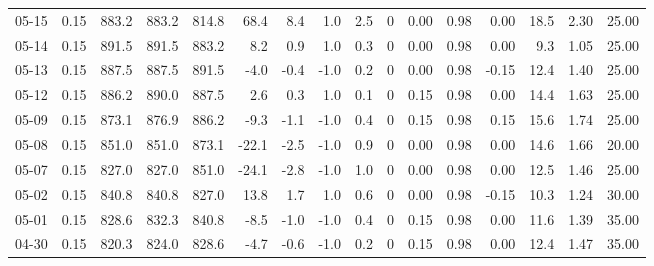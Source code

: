 \begin{threeparttable}
{\begin{tabular}{lrrrrrrrrrrrrrrr}
  05-15 &     0.15 & 883.2 & 883.2 & 814.8 &       68.4 &            8.4 &                      1.0 &                 2.5 &              0 &       0.00 &      0.98 &           0.00 &             18.5 &            2.30 &                  25.00 \\
  05-14 &     0.15 & 891.5 & 891.5 & 883.2 &        8.2 &            0.9 &                      1.0 &                 0.3 &              0 &       0.00 &      0.98 &           0.00 &              9.3 &            1.05 &                  25.00 \\
  05-13 &     0.15 & 887.5 & 887.5 & 891.5 &       -4.0 &           -0.4 &                     -1.0 &                 0.2 &              0 &       0.00 &      0.98 &          -0.15 &             12.4 &            1.40 &                  25.00 \\
  05-12 &     0.15 & 886.2 & 890.0 & 887.5 &        2.6 &            0.3 &                      1.0 &                 0.1 &              0 &       0.15 &      0.98 &           0.00 &             14.4 &            1.63 &                  25.00 \\
  05-09 &     0.15 & 873.1 & 876.9 & 886.2 &       -9.3 &           -1.1 &                     -1.0 &                 0.4 &              0 &       0.15 &      0.98 &           0.15 &             15.6 &            1.74 &                  25.00 \\
  05-08 &     0.15 & 851.0 & 851.0 & 873.1 &      -22.1 &           -2.5 &                     -1.0 &                 0.9 &              0 &       0.00 &      0.98 &           0.00 &             14.6 &            1.66 &                  20.00 \\
  05-07 &     0.15 & 827.0 & 827.0 & 851.0 &      -24.1 &           -2.8 &                     -1.0 &                 1.0 &              0 &       0.00 &      0.98 &           0.00 &             12.5 &            1.46 &                  25.00 \\
  05-02 &     0.15 & 840.8 & 840.8 & 827.0 &       13.8 &            1.7 &                      1.0 &                 0.6 &              0 &       0.00 &      0.98 &          -0.15 &             10.3 &            1.24 &                  30.00 \\
  05-01 &     0.15 & 828.6 & 832.3 & 840.8 &       -8.5 &           -1.0 &                     -1.0 &                 0.4 &              0 &       0.15 &      0.98 &           0.00 &             11.6 &            1.39 &                  35.00 \\
  04-30 &     0.15 & 820.3 & 824.0 & 828.6 &       -4.7 &           -0.6 &                     -1.0 &                 0.2 &              0 &       0.15 &      0.98 &           0.00 &             12.4 &            1.47 &                  35.00 \\

\end{tabular}}
\end{threeparttable}
